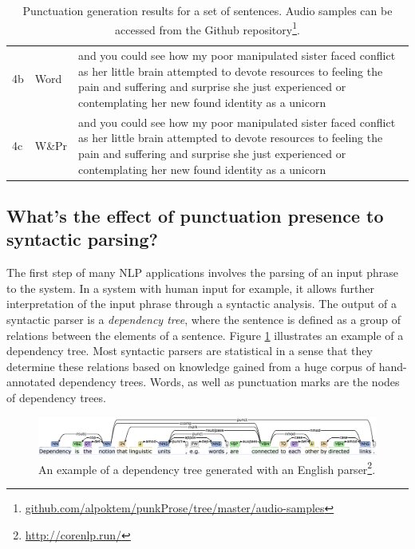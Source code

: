 \begin{table}[tbp]
\begin{tabular}{p{0.5cm}|l|p{12cm}}
4b & Word & and you could see how my poor manipulated sister faced conflict as her little brain attempted to devote resources to feeling the pain and suffering and surprise\mycirc{\textbf{,}} she just experienced or contemplating her new found identity as a unicorn\mycirc{\textbf{.}} \\ 
4c & W\&Pr & and you could see how my poor manipulated sister faced conflict\mycirc{\textbf{,}} as her little brain attempted to devote resources to feeling the pain and suffering and surprise she just experienced\mycirc{\textbf{,}} or contemplating her new found identity as a unicorn\mycirc{\textbf{.}} \\ \midrule
\end{tabular}
\caption{Punctuation generation results for a set of sentences. Audio samples can be accessed from the Github repository\footnote{\url{github.com/alpoktem/punkProse/tree/master/audio-samples}}.}
\label{examples}
\end{table}

\subsection{What's the effect of punctuation presence to syntactic parsing?}
\label{punkProse:experiments:q2}
The first step of many NLP applications involves the parsing of an input phrase to the system. In a system with human input for example, it allows further interpretation of the input phrase through a syntactic analysis. The output of a syntactic parser is a \textit{dependency tree}, where the sentence is defined as a group of relations between the elements of a sentence. Figure \ref{punkProse:figure:parsing} illustrates an example of a dependency tree. Most syntactic parsers are statistical in a sense that they determine these relations based on knowledge gained from a huge corpus of hand-annotated dependency trees. Words, as well as punctuation marks are the nodes of dependency trees. 

\begin{figure}[h]
\centering\includegraphics[width=\linewidth]{img/dependency_tree.png}
\caption{An example of a dependency tree generated with an English parser\footnote{\url{http://corenlp.run/}}.}
\label{punkProse:figure:parsing}
\end{figure}

